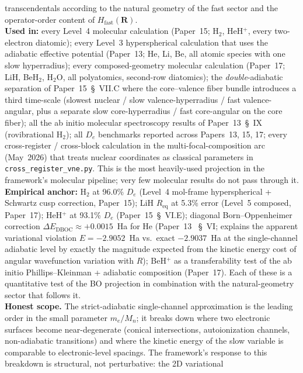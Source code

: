 transcendentals according to the natural geometry of the fast sector
and the operator-order content of $H_\text{fast}(\bm{R})$.\\
\textbf{Used in:} every Level~4 molecular calculation (Paper~15;
H$_2$, HeH$^+$, every two-electron diatomic); every Level~3
hyperspherical calculation that uses the adiabatic effective potential
(Paper~13; He, Li, Be, all atomic species with one slow
hyperradius); every composed-geometry molecular calculation
(Paper~17; LiH, BeH$_2$, H$_2$O, all polyatomics, second-row
diatomics); the \emph{double}-adiabatic separation of Paper~15~\S~VII.C
where the core--valence fiber bundle introduces a third time-scale
(slowest nuclear / slow valence-hyperradius / fast valence-angular,
plus a separate slow core-hyperradius / fast core-angular on the
core fiber); all the ab initio molecular spectroscopy results of
Paper~13~\S~IX (rovibrational H$_2$); all $D_e$ benchmarks reported
across Papers~13, 15, 17; every cross-register / cross-block
calculation in the multi-focal-composition arc (May~2026) that
treats nuclear coordinates as classical parameters in
\texttt{cross\_register\_vne.py}.  This is the most heavily-used
projection in the framework's molecular pipeline; very few molecular
results do not pass through it.\\
\textbf{Empirical anchor:} H$_2$ at 96.0\% $D_e$ (Level~4
mol-frame hyperspherical + Schwartz cusp correction, Paper~15);
LiH $R_\text{eq}$ at 5.3\% error (Level~5 composed, Paper~17);
HeH$^+$ at 93.1\% $D_e$ (Paper~15~\S~VI.E); diagonal Born--Oppenheimer
correction $\Delta E_\text{DBOC} \approx +0.0015$~Ha for He (Paper~13
~\S~VI; explains the apparent variational violation $E = -2.9052$~Ha
vs.\ exact $-2.9037$~Ha at the single-channel adiabatic level by
exactly the magnitude expected from the kinetic energy cost of
angular wavefunction variation with $R$); BeH$^+$ as a transferability
test of the ab initio Phillips--Kleinman + adiabatic composition
(Paper~17).  Each of these is a quantitative test of the BO projection
in combination with the natural-geometry sector that follows it.\\
\textbf{Honest scope.}  The strict-adiabatic single-channel
approximation is the leading order in the small parameter $m_e / M_n$;
it breaks down where two electronic surfaces become near-degenerate
(conical intersections, autoionization channels, non-adiabatic
transitions) and where the kinetic energy of the slow variable is
comparable to electronic-level spacings.  The framework's response to
this breakdown is structural, not perturbative: the 2D variational
